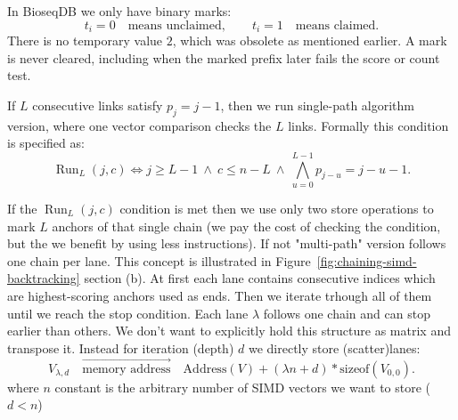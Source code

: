 In BioseqDB we only have binary marks:
\[
  t_i=0\quad\text{means unclaimed},\qquad
  t_i=1\quad\text{means claimed}.
\]
There is no temporary value \(2\), which was obsolete as mentioned earlier.  A mark is never cleared, including when
the marked prefix later fails the score or count test.

If \(L\) consecutive links satisfy \(p_j=j-1\), then we run single-path algorithm version, where one vector comparison checks the \(L\) links. Formally this condition is specified as:
\[
  \operatorname{Run}_L(j,c)\iff
  j\geq L-1\ \land\ c\leq n-L\ \land\
  \bigwedge_{u=0}^{L-1}p_{j-u}=j-u-1.
\]


If the $\operatorname{Run}_L(j,c)$ condition is met then we use only two store operations to mark $L$ anchors of that single chain (we pay the cost of checking the condition, but the we benefit by using less instructions). If not "multi-path" version follows one chain per lane. 
This concept is illustrated in Figure~\ref{fig:chaining-simd-backtracking} section (b). At first each lane contains consecutive indices which are highest-scoring anchors used as ends. Then we iterate trhough all of them until we reach the stop condition. Each lane $\lambda$ follows one chain and can stop 
earlier than others. We don't want to explicitly hold this structure as matrix and transpose it. Instead for iteration (depth) $d$ we directly store (scatter)lanes:
\[
  V_{\lambda,d}\quad\overrightarrow{\text{memory address}}\quad \text{Address}(V)+(\lambda n+d)*\text{sizeof}(V_{0,0}).
\]
where $n$ constant is the arbitrary number of SIMD vectors we want to store ($d < n$)

